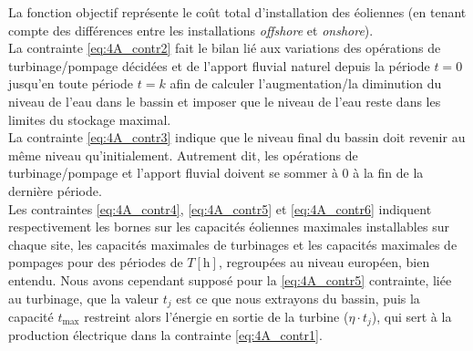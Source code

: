 \documentclass{article}
\newcommand{\unit}[1]{[\mathrm{#1}]}
\begin{document}
\newpage

La fonction objectif représente le coût total d'installation des éoliennes (en tenant compte des différences entre les installations \textit{offshore} et \textit{onshore}). \\
La contrainte \eqref{eq:4A_contr2} fait le bilan lié aux variations des opérations de turbinage/pompage décidées et de l'apport fluvial naturel depuis la période $t = 0$ jusqu'en toute période $t = k$ afin de calculer l'augmentation/la diminution du niveau de l'eau dans le bassin 
et imposer que le niveau de l'eau reste dans les limites du stockage maximal.\\
La contrainte \eqref{eq:4A_contr3} indique que le niveau final du bassin doit revenir au même niveau qu'initialement. Autrement dit, les opérations de turbinage/pompage et 
l'apport fluvial doivent se sommer à 0 à la fin de la dernière période.\\
Les contraintes \eqref{eq:4A_contr4}, \eqref{eq:4A_contr5} et \eqref{eq:4A_contr6} indiquent respectivement les bornes sur les capacités éoliennes maximales installables sur chaque site, 
les capacités maximales de turbinages et les capacités maximales de pompages pour des périodes de $T \unit{h}$, regroupées au niveau européen, bien entendu.
Nous avons cependant supposé pour la \eqref{eq:4A_contr5} contrainte, liée au turbinage, que la valeur $t_j$ est ce que 
nous extrayons du bassin, puis
la capacité $t_\mathrm{max}$ restreint alors l'énergie en sortie de la turbine ($\eta \cdot t_j$), qui sert à la 
production électrique dans la contrainte \eqref{eq:4A_contr1}.

\newpage %
\end{document}

